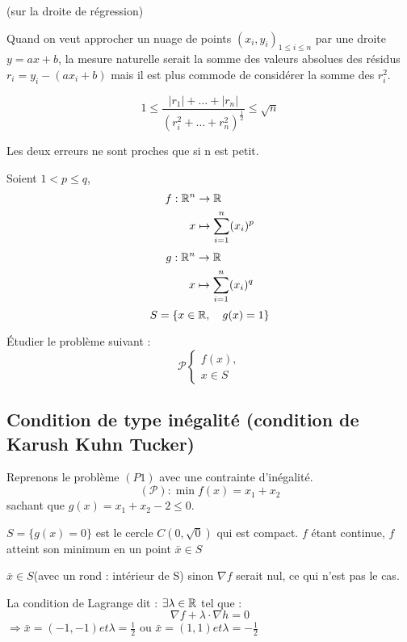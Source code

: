 \begin{remarque} (sur la droite de régression)

	Quand on veut approcher un nuage de points $(x_i, y_i)_{1 \leq i \leq n}$ par une droite $y = ax +b$, la mesure naturelle serait la somme des valeurs absolues des résidus $r_i = y_i -(ax_i+b)$ mais il est plus commode de considérer la somme des $r_i^2$.

	\[ 1 \leq \frac{ |r_1| + \dots + |r_n| }{ (r_i^2 + \dots + r_n^2)^{\frac{1}{2}} } \leq \sqrt{n} \]
	
	Les deux erreurs ne sont proches que si n est petit.
\end{remarque}

\begin{exemple}
	Soient $1 < p \leq q$,
	\begin{align*}
	f : \mathbb{R}^n & \rightarrow  \mathbb{R} \\
	x & \mapsto \sum_{i=1}^n (x_i)^p
	\end{align*}
	\begin{align*}
	g : \mathbb{R}^n & \rightarrow  \mathbb{R} \\
	x & \mapsto \sum_{i=1}^n (x_i)^q
	\end{align*}
	\[ S = \{ x \in \mathbb{R}, \quad g(x) = 1 \} \]
	
	Étudier le problème suivant :
	\[ \mathcal{P} \begin{cases} f(x), \\ x \in S \end{cases} \]
	
	
\end{exemple}

\subsection{Condition de type inégalité (condition de Karush Kuhn Tucker)}

\begin{exemple}
	Reprenons le problème $(P1)$ avec une contrainte d'inégalité.
	\[ (\mathcal{P}) : \min f(x) = x_1 + x_2 \]
	sachant que $g(x) = x_1+x_2 -2 \leq 0$.
	
	$S = \{ g(x) = 0 \}$ est le cercle $C(0, \sqrt{0})$ qui est compact. $f$ étant continue, $f$ atteint son minimum en un point $\bar{x} \in S$
	
	$\bar{x} \in S$(avec un rond : intérieur de S) sinon $\nabla f$ serait nul, ce qui n'est pas le cas.
	
	La condition de Lagrange dit : $\exists \lambda \in \mathbb{R}$ tel que : \[ \nabla f + \lambda \cdot \nabla h = 0 \]
	$\Rightarrow \bar{x} = (-1, -1) et \lambda = \frac{1}{2}$ ou $\bar{x} = (1, 1) et \lambda = -\frac{1}{2}$
	
\end{exemple}
	
